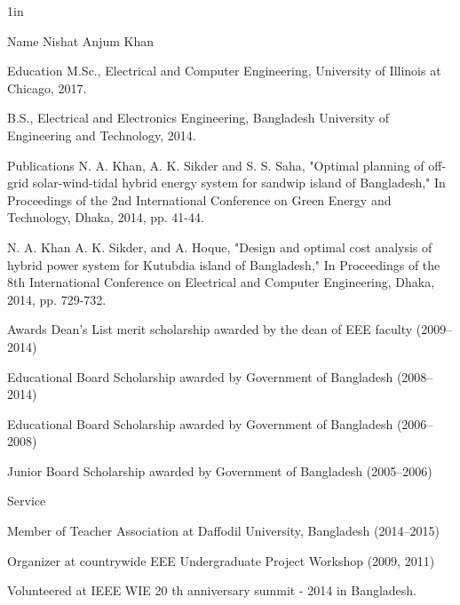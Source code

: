 \vita
\singlespace
\begin{list}
{}
{\setlength
   {}{1in}
    \setlength{\leftmargin}{0.8in}
    \setlength{\labelsep}{.2in}
    \setlength{\itemsep}{0.2in}
    \setlength{\rightmargin}{\leftmargin}}

\item[Name\hfill] Nishat Anjum Khan

\item[Education\hfill] M.Sc., Electrical and Computer Engineering, University of Illinois at Chicago, 2017.

B.S., Electrical and Electronics Engineering, Bangladesh University of Engineering and Technology, 2014.

\item[Publications\hfill]
N. A. Khan, A. K. Sikder and S. S. Saha, "Optimal planning of off-grid solar-wind-tidal hybrid energy system for sandwip island of Bangladesh," In Proceedings of the 2nd International Conference on Green Energy and Technology, Dhaka, 2014, pp. 41-44.

N. A. Khan A. K. Sikder, and A. Hoque, "Design and optimal cost analysis of hybrid power system for Kutubdia island of Bangladesh," In Proceedings of the 8th International Conference on Electrical and Computer Engineering, Dhaka, 2014, pp. 729-732.


\item[Awards\hfill]
Dean’s List merit scholarship awarded by the dean of EEE faculty (2009--2014)

Educational Board Scholarship awarded by Government of Bangladesh (2008--2014)

Educational Board Scholarship awarded by Government of Bangladesh (2006--2008)

Junior Board Scholarship awarded by Government of Bangladesh (2005--2006)

\item[Service\hfill] 

Member of Teacher Association at Daffodil University, Bangladesh (2014--2015)

Organizer at countrywide EEE Undergraduate Project Workshop (2009, 2011)

Volunteered at IEEE WIE 20 th anniversary summit - 2014 in Bangladesh.

\end{list}


